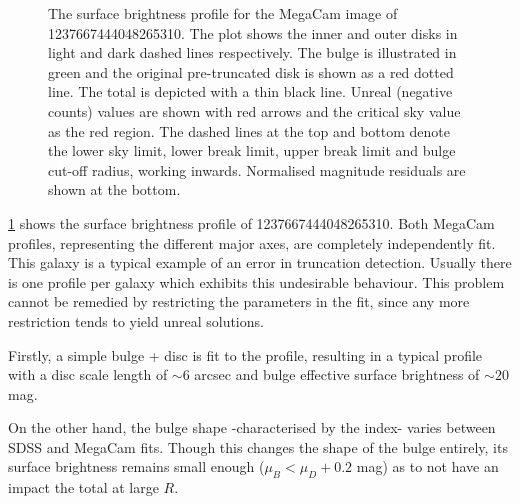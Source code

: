 \begin{figure}
	\centering
	\label{fig: The mega profiles of 1237667444048265310}
	\caption{\footnotesize{The surface brightness profile for the MegaCam image of 1237667444048265310. The plot shows the inner and outer disks in light and dark dashed lines respectively. The bulge is illustrated in green and the original pre-truncated disk is shown as a red dotted line. The total is depicted with a thin black line.
		 Unreal (negative counts) values are shown with red arrows and the critical sky value as the red region. The dashed lines at the top and bottom denote the lower sky limit, lower break limit, upper break limit and bulge cut-off radius, working inwards. Normalised magnitude residuals are shown at the bottom.}}
\end{figure}
\ref{fig: The mega profiles of 1237667444048265310} shows the surface brightness profile of 1237667444048265310. Both MegaCam profiles, representing the different major axes, are completely independently fit. This galaxy is a typical example of an error in truncation detection. Usually there is one profile per galaxy which exhibits this undesirable behaviour. This problem cannot be remedied by restricting the parameters in the fit, since any more restriction tends to yield unreal solutions.

Firstly, a simple bulge + disc is fit to the profile, resulting in a typical profile with a disc scale length of $\sim 6$ arcsec and bulge effective surface brightness of $\sim 20$ mag. 

On the other hand, the bulge shape -characterised by the \sersic index- varies between SDSS and MegaCam fits. Though this changes the shape of the bulge entirely, its surface brightness remains small enough ($\mu_B < \mu_D + 0.2$ mag) as to not have an impact the total at large $R$.

